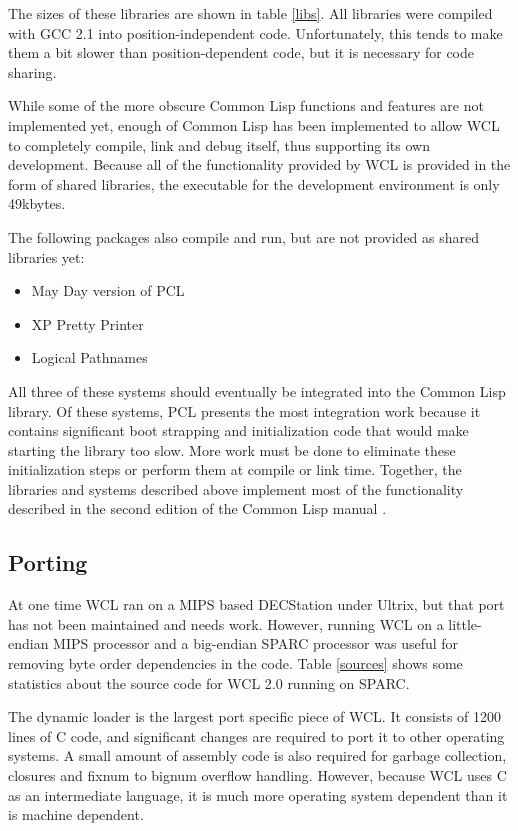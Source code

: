 The sizes of these libraries are shown in table \ref{libs}.  All
libraries were compiled with GCC 2.1 \cite{gcc} into
position-independent code.  Unfortunately, this tends to make them a
bit slower than position-dependent code, but it is necessary for code
sharing.

While some of the more obscure Common Lisp functions and features are
not implemented yet, enough of Common Lisp has been implemented to
allow WCL to completely compile, link and debug itself, thus
supporting its own development.  Because all of the functionality
provided by WCL is provided in the form of shared libraries, the
executable for the development environment is only 49kbytes.

The following packages also compile and run, but are not provided as
shared libraries yet:
\begin{itemize}
\item May Day version of PCL \cite{pcl}

\item XP Pretty Printer 

\item Logical Pathnames
\end{itemize}

All three of these systems should eventually be integrated into the
Common Lisp library. Of these systems, PCL presents the most
integration work because it contains significant boot strapping and
initialization code that would make starting the library too slow.
More work must be done to eliminate these initialization steps or
perform them at compile or link time.  Together, the libraries and
systems described above implement most of the functionality described
in the second edition of the Common Lisp manual \cite{cltl2}.

\subsection{Porting}

At one time WCL ran on a MIPS based DECStation under Ultrix, but that
port has not been maintained and needs work. However, running WCL on a
little-endian MIPS processor and a big-endian SPARC processor was
useful for removing byte order dependencies in the code.  Table
\ref{sources} shows some statistics about the source code for 
WCL 2.0 running on SPARC.

The dynamic loader is the largest port specific piece of WCL.  It
consists of 1200 lines of C code, and significant changes are required
to port it to other operating systems.  A small amount of assembly
code is also required for garbage collection, closures and fixnum to bignum
overflow handling. However, because WCL uses C as an intermediate language,
it is much more operating system dependent than it is machine dependent.


